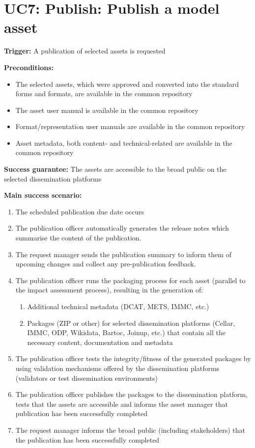 	\section{UC7: Publish: Publish a model asset}
	\label{sec:uc7}
		
	\textbf{Trigger:} A publication of selected assets is requested
	
	\textbf{Preconditions:} 
	\begin{itemize}
		\item The selected assets, which were approved and converted into the standard forms and formats, are available in the common repository
		\item The asset user manual is available in the common repository
		\item Format/representation user manuals are available in the common repository
		\item Asset metadata, both content- and technical-related are available in the common repository
	\end{itemize}
	
	\textbf{Success guarantee:} The assets are accessible to the broad public on the selected dissemination platforms
	
	\textbf{Main success scenario:} 
	\begin{enumerate}
		\item The scheduled publication due date occurs
		\item The publication officer automatically generates the release notes which summarise the content of the publication.
		\item The request manager sends the publication summary to inform them of upcoming changes and collect any pre-publication feedback.
		\item The publication officer runs the packaging process for each asset (parallel to the impact assessment process), resulting in the generation of: 
		\begin{enumerate}
		\item Additional technical metadata (DCAT, METS, IMMC, etc.)
		\item Packages (ZIP or other) for selected dissemination platforms (Cellar, IMMC, ODP, Wikidata, Bartoc, Joinup, etc.) that contain all the necessary content, documentation and metadata
		\end{enumerate}
		\item The publication officer tests the integrity/fitness of the generated packages by using validation mechanisms offered by the dissemination platforms (validators or test dissemination environments)
		\item The publication officer publishes the packages to the dissemination platform, tests that the assets are accessible and informs the asset manager that publication has been successfully completed
		\item The request manager informs the broad public (including stakeholders) that the publication has been successfully completed
		
	\end{enumerate}
		

